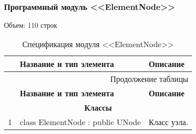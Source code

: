 \subsubsection*{Программный модуль <<ElementNode>>}
Объем: 110 строк

\small
\singlespacing
\begin{longtable}[h]{|p{}|p{}|p{}|}
  \caption{Спецификация модуля <<ElementNode>>}
	\\ \hline
	  \textbf{\No}                  &
	  \textbf{Название и тип элемента}  &
	  \textbf{Описание}
	\\ \hline
  \endfirsthead

  \multicolumn{3}{r}{Продолжение таблицы \thetable{}}
  \\ \hline
	  \textbf{\No}                  &
	  \textbf{Название и тип элемента}  &
	  \textbf{Описание}
	\\ \hline
  \endhead

  \multicolumn{3}{|c|}{\textbf{Классы}} \\
  \hline
  1 & class ElementNode : public UNode & Класс узла. \\ \hline
\end{longtable}
\normalsize
\onehalfspacing


